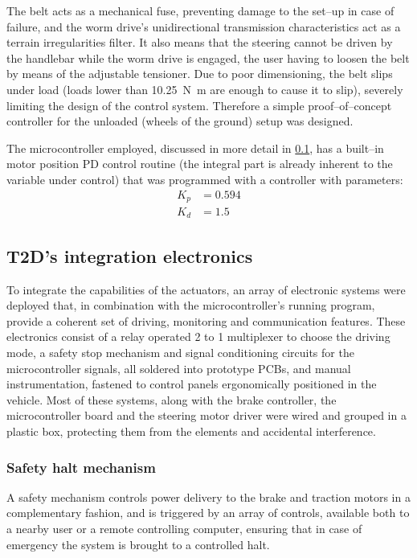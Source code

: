 \documentclass[journal]{IEEEtran}
\begin{document}
The belt acts as a mechanical fuse, preventing damage to the set--up in case of failure, and the worm drive's unidirectional transmission characteristics act as a terrain irregularities filter. It also means that the steering cannot be driven by the handlebar while the worm drive is engaged, the user having to loosen the belt by means of the adjustable tensioner. Due to poor dimensioning, the belt slips under load (loads lower than \SI{10.25}{\newton\meter} are enough to cause it to slip), severely limiting the design of the control system. Therefore a simple proof--of--concept controller for the unloaded (wheels of the ground) setup was designed.

The microcontroller employed, discussed in more detail in \ref{ssec:integracao}, has a built--in motor position \ac{PD} control routine (the integral part is already inherent to the variable under control) that was programmed with a controller with parameters:
%
\begin{align}
    K_p &= \num{0.594}\\
    K_d &= \num{1.5}
\end{align}

\subsection{T2D's integration electronics}
\label{ssec:integracao}

To integrate the capabilities of the actuators, an array of electronic systems were deployed that, in combination with the microcontroller's running program, provide a coherent set of driving, monitoring and communication features. These electronics consist of a relay operated 2 to 1 multiplexer to choose the driving mode, a safety stop mechanism and signal conditioning circuits for the microcontroller signals, all soldered into prototype \acp{PCB}, and manual instrumentation, fastened to control panels ergonomically positioned in the vehicle. Most of these systems, along with the brake controller, the microcontroller board and the steering motor driver were wired and grouped in a plastic box, protecting them from the elements and accidental interference.

\subsubsection{Safety halt mechanism}
\label{ssec:halt}

A safety mechanism controls power delivery to the brake and traction motors in a complementary fashion, and is triggered by an array of controls, available both to a nearby user or a remote controlling computer, ensuring that in case of emergency the system is brought to a controlled halt.
\end{document}
